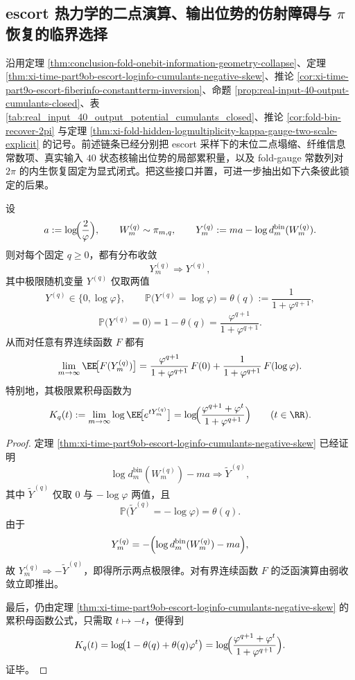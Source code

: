 \subsection{escort 热力学的二点演算、输出位势的仿射障碍与 \texorpdfstring{$\pi$}{pi} 恢复的临界选择}\label{subsec:conclusion-escort-thermodynamics-affine-obstruction-pi-selection}
沿用定理 \ref{thm:conclusion-fold-onebit-information-geometry-collapse}、定理 \ref{thm:xi-time-part9ob-escort-loginfo-cumulants-negative-skew}、推论 \ref{cor:xi-time-part9o-escort-fiberinfo-constantterm-inversion}、命题 \ref{prop:real-input-40-output-cumulants-closed}、表 \ref{tab:real_input_40_output_potential_cumulants_closed}、推论 \ref{cor:fold-bin-recover-2pi} 与定理 \ref{thm:xi-fold-hidden-logmultiplicity-kappa-gauge-two-scale-explicit} 的记号。前述链条已经分别把 escort 采样下的末位二点塌缩、纤维信息常数项、真实输入 \(40\) 状态核输出位势的局部累积量，以及 fold-gauge 常数列对 \(2\pi\) 的内生恢复固定为显式闭式。把这些接口并置，可进一步抽出如下六条彼此锁定的后果。

\begin{theorem}\label{thm:conclusion-escort-thermodynamics-two-point-functional-calculus}
设
\[
a:=\log\!\Bigl(\frac{2}{\varphi}\Bigr),
\qquad
W_m^{(q)}\sim \pi_{m,q},
\qquad
Y_m^{(q)}:=ma-\log d_m^{\mathrm{bin}}(W_m^{(q)}).
\]
则对每个固定 \(q\ge 0\)，都有分布收敛
\[
Y_m^{(q)}\Rightarrow Y^{(q)},
\]
其中极限随机变量 \(Y^{(q)}\) 仅取两值
\[
Y^{(q)}\in\{0,\log\varphi\},
\qquad
\mathbb P\!\bigl(Y^{(q)}=\log\varphi\bigr)=\theta(q):=\frac{1}{1+\varphi^{q+1}},
\]
\[
\mathbb P\!\bigl(Y^{(q)}=0\bigr)=1-\theta(q)=\frac{\varphi^{q+1}}{1+\varphi^{q+1}}.
\]
从而对任意有界连续函数 \(F\) 都有
\[
\lim_{m\to\infty}\EE\!\bigl[F(Y_m^{(q)})\bigr]
=
\frac{\varphi^{q+1}}{1+\varphi^{q+1}}\,F(0)
+
\frac{1}{1+\varphi^{q+1}}\,F(\log\varphi).
\]
特别地，其极限累积母函数为
\[
K_q(t)
:=
\lim_{m\to\infty}\log\EE\!\bigl[e^{tY_m^{(q)}}\bigr]
=
\log\!\Bigl(\frac{\varphi^{q+1}+\varphi^{t}}{1+\varphi^{q+1}}\Bigr)
\qquad (t\in\RR).
\]
\end{theorem}
\begin{proof}
定理 \ref{thm:xi-time-part9ob-escort-loginfo-cumulants-negative-skew} 已经证明
\[
\log d_m^{\mathrm{bin}}(W_m^{(q)})-ma
\Rightarrow
\widetilde Y^{(q)},
\]
其中 \(\widetilde Y^{(q)}\) 仅取 \(0\) 与 \(-\log\varphi\) 两值，且
\[
\mathbb P\!\bigl(\widetilde Y^{(q)}=-\log\varphi\bigr)=\theta(q).
\]
由于
\[
Y_m^{(q)}
=
-\Bigl(\log d_m^{\mathrm{bin}}(W_m^{(q)})-ma\Bigr),
\]
故 \(Y_m^{(q)}\Rightarrow-\widetilde Y^{(q)}\)，即得所示两点极限律。对有界连续函数 \(F\) 的泛函演算由弱收敛立即推出。

最后，仍由定理 \ref{thm:xi-time-part9ob-escort-loginfo-cumulants-negative-skew} 的累积母函数公式，只需取 \(t\mapsto -t\)，便得到
\[
K_q(t)
=
\log\!\bigl(1-\theta(q)+\theta(q)\varphi^t\bigr)
=
\log\!\Bigl(\frac{\varphi^{q+1}+\varphi^t}{1+\varphi^{q+1}}\Bigr).
\]
证毕。
\end{proof}

